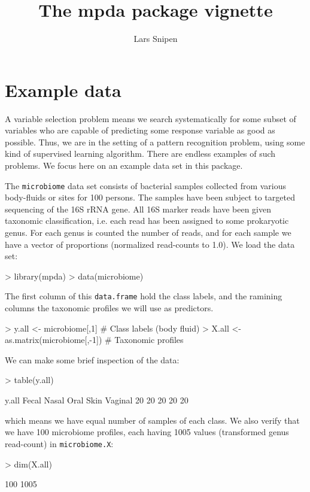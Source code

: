 \documentclass[a4paper]{article}
\title{The mpda package vignette}
\author{Lars Snipen}
\date{}
\begin{document}

\maketitle




\section{Example data}
A variable selection problem means we search systematically for some subset of variables who are capable of predicting some response variable as good as possible. Thus, we are in the setting of a pattern recognition problem, using some kind of supervised learning algorithm. There are endless examples of such problems. We focus here on an example data set in this package.

The \texttt{microbiome} data set consists of bacterial samples collected from various body-fluids or sites for 100 persons. The samples have been subject to targeted sequencing of the 16S rRNA gene. All 16S marker reads have been given taxonomic classification, i.e. each read has been assigned to some prokaryotic genus. For each genus is counted the number of reads, and for each sample we have a vector of proportions (normalized read-counts to 1.0). We load the data set:
\begin{Schunk}
\begin{Sinput}
> library(mpda)
> data(microbiome)
\end{Sinput}
\end{Schunk}

The first column of this \texttt{data.frame} hold the class labels, and the ramining columns the taxonomic profiles we will use as predictors.
\begin{Schunk}
\begin{Sinput}
> y.all <- microbiome[,1]             # Class labels (body fluid)
> X.all <- as.matrix(microbiome[,-1]) # Taxonomic profiles
\end{Sinput}
\end{Schunk}

We can make some brief inspection of the data:
\begin{Schunk}
\begin{Sinput}
> table(y.all)
\end{Sinput}
\begin{Soutput}
y.all
  Fecal   Nasal    Oral    Skin Vaginal 
     20      20      20      20      20 
\end{Soutput}
\end{Schunk}
which means we have equal number of samples of each class. We also verify that we have 100 microbiome profiles, each having 1005 values (transformed genus read-count) in \texttt{microbiome.X}:
\begin{Schunk}
\begin{Sinput}
> dim(X.all)
\end{Sinput}
\begin{Soutput}
[1]  100 1005
\end{Soutput}
\end{Schunk}
\end{document}
